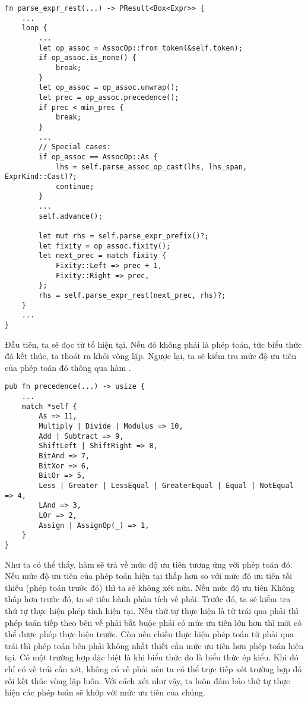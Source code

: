 \begin{lstlisting}[]
fn parse_expr_rest(...) -> PResult<Box<Expr>> {
    ...
    loop {
        ...
        let op_assoc = AssocOp::from_token(&self.token);
        if op_assoc.is_none() {
            break;
        }
        let op_assoc = op_assoc.unwrap();
        let prec = op_assoc.precedence();
        if prec < min_prec {
            break;
        }
        ...
        // Special cases:
        if op_assoc == AssocOp::As {
            lhs = self.parse_assoc_op_cast(lhs, lhs_span, ExprKind::Cast)?;
            continue;
        }
        ...
        self.advance();

        let mut rhs = self.parse_expr_prefix()?;
        let fixity = op_assoc.fixity();
        let next_prec = match fixity {
            Fixity::Left => prec + 1,
            Fixity::Right => prec,
        };
        rhs = self.parse_expr_rest(next_prec, rhs)?;
    }
    ...
}
\end{lstlisting}

    Đầu tiên, ta sẽ đọc từ tố hiện tại. Nếu đó không phải là phép toán, tức biểu thức đã kết thúc, ta thoát ra khỏi vòng lặp. Ngược lại, ta sẽ kiểm tra mức độ ưu tiên của phép toán đó thông qua hàm . 

\begin{lstlisting}[]
pub fn precedence(...) -> usize {
    ...
    match *self {
        As => 11,
        Multiply | Divide | Modulus => 10,
        Add | Subtract => 9,
        ShiftLeft | ShiftRight => 8,
        BitAnd => 7,
        BitXor => 6,
        BitOr => 5,
        Less | Greater | LessEqual | GreaterEqual | Equal | NotEqual => 4,
        LAnd => 3,
        LOr => 2,
        Assign | AssignOp(_) => 1,
    }
}
\end{lstlisting}

    Như ta có thể thấy, hàm  sẽ trả về mức độ ưu tiên tương ứng với phép toán đó. Nếu mức độ ưu tiên của phép toán hiện tại thấp hơn so với mức độ ưu tiên tối thiểu (phép toán trước đó) thì ta sẽ không xét nữa. Nếu mức độ ưu tiên Không thấp hơn trước đó, ta sẽ tiến hành phân tích vế phải. Trước đó, ta sẽ kiểm tra thứ tự thực hiện phép tính hiện tại. Nếu thứ tự thực hiện là từ trái qua phải thì phép toán tiếp theo bên vế phải bắt buộc phải có mức ưu tiên lớn hơn thì mới có thể được phép thực hiện trước. Còn nếu chiều thực hiện phép toán từ phải qua trái thì phép toán bên phải không nhất thiết cần mức ưu tiên hơn phép toán hiện tại. Có một trường hợp đặc biệt là khi biểu thức đo là biểu thức ép kiểu. Khi đó chỉ có vế trái cần xét, không có vế phải nên ta có thể trực tiếp xét trường hợp đó rồi kết thúc vòng lặp luôn. Với cách xét như vậy, ta luôn đảm bảo thứ tự thực hiện các phép toán sẽ khớp với mức ưu tiên của chúng.     

